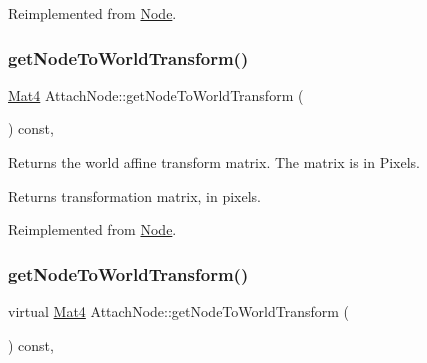 Reimplemented from \hyperlink{classNode_a7235b4a4d449fb7e01459c5c3b24d1eb}{Node}.

\mbox{\label{classAttachNode_acb93bdd6d5c0e981b081513d3e307b49}} 
\subsubsection{\texorpdfstring{get\+Node\+To\+World\+Transform()}{getNodeToWorldTransform()}\hspace{0.1cm}{\footnotesize\ttfamily [1/2]}}
{\footnotesize\ttfamily \hyperlink{classMat4}{Mat4} Attach\+Node\+::get\+Node\+To\+World\+Transform (\begin{DoxyParamCaption}{ }\end{DoxyParamCaption}) const\hspace{0.3cm}{\ttfamily [override]}, {\ttfamily [virtual]}}

Returns the world affine transform matrix. The matrix is in Pixels.

\begin{DoxyReturn}{Returns}
transformation matrix, in pixels. 
\end{DoxyReturn}


Reimplemented from \hyperlink{classNode_a1e46065101d0d5dba32262067d85bf23}{Node}.

\mbox{\label{classAttachNode_a53970668bcd205b385e4dd0ae2af8039}} 
\subsubsection{\texorpdfstring{get\+Node\+To\+World\+Transform()}{getNodeToWorldTransform()}\hspace{0.1cm}{\footnotesize\ttfamily [2/2]}}
{\footnotesize\ttfamily virtual \hyperlink{classMat4}{Mat4} Attach\+Node\+::get\+Node\+To\+World\+Transform (\begin{DoxyParamCaption}{ }\end{DoxyParamCaption}) const\hspace{0.3cm}{\ttfamily [override]}, {\ttfamily [virtual]}}


